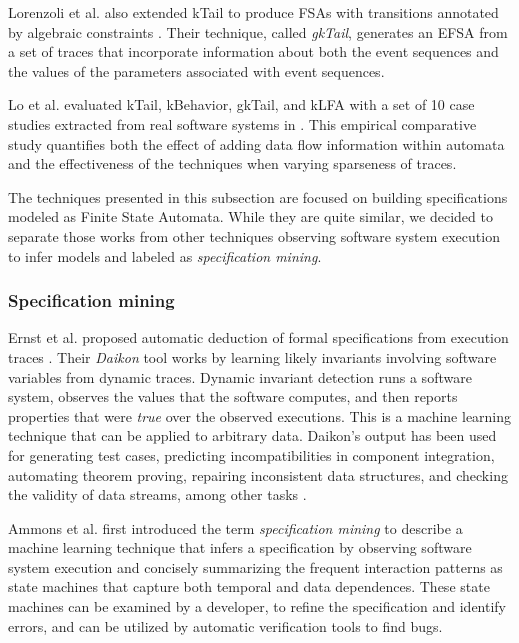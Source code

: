 Lorenzoli et al. also extended kTail to produce FSAs with
transitions annotated by algebraic constraints
\cite{Lorenzoli2008}. Their technique, called \textit{gkTail},
generates an EFSA from a set of traces that incorporate
information about both the event sequences and the values of the
parameters associated with event sequences.

Lo et al. evaluated kTail, kBehavior, gkTail, and kLFA with a set
of 10 case studies extracted from real software systems in
\cite{Lo20122063}. This empirical comparative study quantifies
both the effect of adding data flow information within automata
and the effectiveness of the techniques when varying sparseness
of traces.

The techniques presented in this subsection are focused on building
specifications modeled as Finite State Automata. While they are
quite similar, we decided to separate those works from other
techniques observing software system execution to infer models
and labeled as \textit{specification mining}.


\subsubsection{Specification mining}
\label{sec:related:modelinf:passive-spec}

Ernst et al. proposed automatic deduction of formal
specifications from execution traces
\cite{Ernst:1999:DDL:302405.302467}. Their \textit{Daikon} tool
works by learning likely invariants involving software variables
from dynamic traces. Dynamic invariant detection runs a software
system, observes the values that the software computes, and then
reports properties that were \textit{true} over the observed
executions.  This is a machine learning technique that can be
applied to arbitrary data.  Daikon's output has been used for
generating test cases, predicting incompatibilities in component
integration, automating theorem proving, repairing inconsistent
data structures, and checking the validity of data streams, among
other tasks \cite{Ernst200735}.

Ammons et al. first introduced the term \textit{specification
mining} \cite{Ammons:2002:MS:565816.503275} to describe a machine
learning technique that infers a specification by observing
software system execution and concisely summarizing the frequent
interaction patterns as state machines that capture both temporal
and data dependences. These state machines can be examined by a
developer, to refine the specification and identify errors, and
can be utilized by automatic verification tools to find bugs.

